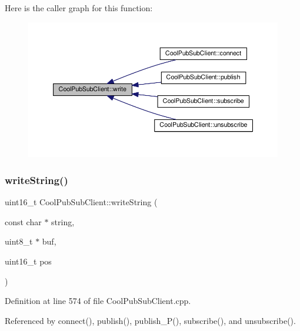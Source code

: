 Here is the caller graph for this function\+:\nopagebreak
\begin{figure}[H]
\begin{center}
\leavevmode
\includegraphics[width=350pt]{d8/d4b/class_cool_pub_sub_client_a7a8e4854a1846eaa668046d3854d47ad_icgraph}
\end{center}
\end{figure}
\mbox{\label{class_cool_pub_sub_client_a0e3d7e776d4cf4427f9569b28868905a}} 
\subsubsection{\texorpdfstring{write\+String()}{writeString()}}
{\footnotesize\ttfamily uint16\+\_\+t Cool\+Pub\+Sub\+Client\+::write\+String (\begin{DoxyParamCaption}\item[{const char $\ast$}]{string,  }\item[{uint8\+\_\+t $\ast$}]{buf,  }\item[{uint16\+\_\+t}]{pos }\end{DoxyParamCaption})\hspace{0.3cm}{\ttfamily [private]}}



Definition at line 574 of file Cool\+Pub\+Sub\+Client.\+cpp.



Referenced by connect(), publish(), publish\+\_\+\+P(), subscribe(), and unsubscribe().


